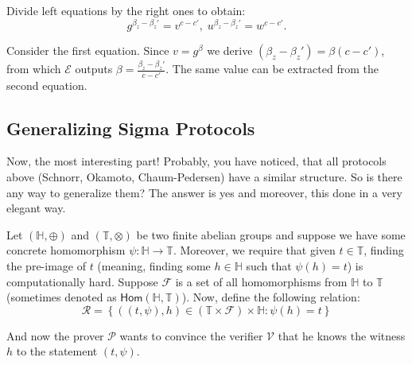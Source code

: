 \documentclass[../lecture-notes.tex]{subfiles}
\begin{document}
Divide left equations by the right ones to obtain:
\begin{equation*}
    g^{\beta_z - \beta_z'} = v^{c-c'}, \; u^{\beta_z - \beta_z'} = w^{c-c'}.
\end{equation*}

Consider the first equation. Since $v=g^{\beta}$ we derive $(\beta_z-\beta_z') = \beta(c-c')$, from which $\mathcal{E}$ outputs $\beta = \frac{\beta_z-\beta_z'}{c-c'}$. The same value can be extracted from the second equation.

\subsection{Generalizing Sigma Protocols}

Now, the most interesting part! Probably, you have noticed, that all protocols above (Schnorr, Okamoto, Chaum-Pedersen) have a similar structure. So is there any way to generalize them? The answer is yes and moreover, this done in a very elegant way.

Let $(\mathbb{H}, \oplus)$ and $(\mathbb{T}, \otimes)$ be two finite abelian groups and suppose we have some concrete homomorphism $\psi: \mathbb{H} \to \mathbb{T}$. Moreover, we require that given $t \in \mathbb{T}$, finding the pre-image of $t$ (meaning, finding some $h \in \mathbb{H}$ such that $\psi(h)=t$) is computationally hard. Suppose $\mathcal{F}$ is a set of all homomorphisms from $\mathbb{H}$ to $\mathbb{T}$ (sometimes denoted as $\mathsf{Hom}(\mathbb{H}, \mathbb{T})$). Now, define the following relation:
\begin{equation*}
    \mathcal{R} = \left\{ ((t,\psi), h) \in (\mathbb{T} \times \mathcal{F}) \times \mathbb{H}: \psi(h) = t \right\}
\end{equation*}

And now the prover $\mathcal{P}$ wants to convince the verifier $\mathcal{V}$ that he knows the witness $h$ to the statement $(t,\psi)$. 

\vspace{-1mm}
\end{document}
